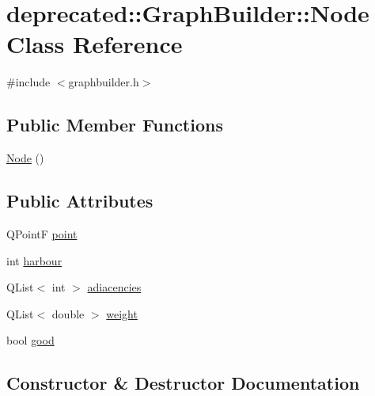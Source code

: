 \hypertarget{classdeprecated_1_1_graph_builder_1_1_node}{}\section{deprecated\+::Graph\+Builder\+::Node Class Reference}
\label{classdeprecated_1_1_graph_builder_1_1_node}


{\ttfamily \#include $<$graphbuilder.\+h$>$}

\subsection*{Public Member Functions}
\begin{DoxyCompactItemize}
\item 
\mbox{\hyperlink{classdeprecated_1_1_graph_builder_1_1_node_a45ebeeecfe2255ae2b0ee2ba589af91d}{Node}} ()
\end{DoxyCompactItemize}
\subsection*{Public Attributes}
\begin{DoxyCompactItemize}
\item 
Q\+PointF \mbox{\hyperlink{classdeprecated_1_1_graph_builder_1_1_node_a97cd7ca78b051b9129d7ce0c2efcc151}{point}}
\item 
int \mbox{\hyperlink{classdeprecated_1_1_graph_builder_1_1_node_aa1ebace5fbb69f4ce818d70e799ee46a}{harbour}}
\item 
Q\+List$<$ int $>$ \mbox{\hyperlink{classdeprecated_1_1_graph_builder_1_1_node_aa0efe2ca8d1705a2652e6303eddddd24}{adiacencies}}
\item 
Q\+List$<$ double $>$ \mbox{\hyperlink{classdeprecated_1_1_graph_builder_1_1_node_ac9ca8e6863d6c0a2236bfab05511f551}{weight}}
\item 
bool \mbox{\hyperlink{classdeprecated_1_1_graph_builder_1_1_node_a940caa190cb8cdbedbd4adb621032065}{good}}
\end{DoxyCompactItemize}


\subsection{Constructor \& Destructor Documentation}
\mbox{\label{classdeprecated_1_1_graph_builder_1_1_node_a45ebeeecfe2255ae2b0ee2ba589af91d}} 
